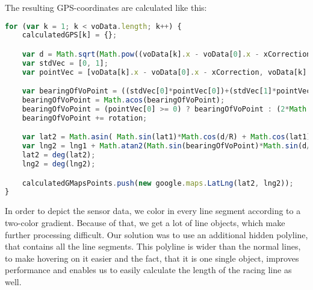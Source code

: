 The resulting GPS-coordinates are calculated like this:

\begin{lstlisting}[language=JavaScript]
for (var k = 1; k < voData.length; k++) {
	calculatedGPS[k] = {};

	var d = Math.sqrt(Math.pow((voData[k].x - voData[0].x - xCorrection), 2) + Math.pow((voData[k].y - voData[0].y - yCorrection), 2)) * voScaleFactor / 1000;
	var stdVec = [0, 1];
	var pointVec = [voData[k].x - voData[0].x - xCorrection, voData[k].y - voData[0].y - yCorrection];

	var bearingOfVoPoint = ((stdVec[0]*pointVec[0])+(stdVec[1]*pointVec[1]))/(Math.sqrt(Math.pow(stdVec[0], 2)+Math.pow(stdVec[1], 2))*Math.sqrt(Math.pow(pointVec[0], 2)+Math.pow(pointVec[1], 2)));
	bearingOfVoPoint = Math.acos(bearingOfVoPoint);
	bearingOfVoPoint = (pointVec[0] >= 0) ? bearingOfVoPoint : (2*Math.PI)-bearingOfVoPoint;
	bearingOfVoPoint += rotation;

	var lat2 = Math.asin( Math.sin(lat1)*Math.cos(d/R) + Math.cos(lat1)*Math.sin(d/R)*Math.cos(bearingOfVoPoint) );
	var lng2 = lng1 + Math.atan2(Math.sin(bearingOfVoPoint)*Math.sin(d/R)*Math.cos(lat1), Math.cos(d/R)-Math.sin(lat1)*Math.sin(lat2));
	lat2 = deg(lat2);
	lng2 = deg(lng2);

	calculatedGMapsPoints.push(new google.maps.LatLng(lat2, lng2));
}
\end{lstlisting}

In order to depict the sensor data, we color in every line segment according to a two-color gradient. Because of that, we get a lot of line objects, which make further processing difficult. Our solution was to use an additional hidden polyline, that contains all the line segments. This polyline is wider than the normal lines, to make hovering on it easier and the fact, that it is one single object, improves performance and enables us to easily calculate the length of the racing line as well.

\clearpage